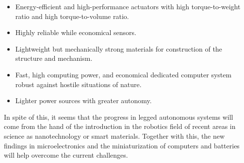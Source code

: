 \begin{itemize}
	\item Energy-efficient and high-performance actuators with high torque-to-weight ratio and high torque-to-volume ratio.
	\item Highly reliable while economical sensors.
	\item Lightweight but mechanically strong materials for construction of the structure and mechanism.
	\item Fast, high computing power, and economical dedicated computer system robust against hostile situations of nature.
	\item Lighter power sources with greater autonomy.
\label{list:hardware_challenges}
\end{itemize}

In spite of this, it seems that the progress in legged autonomous systems will come from the hand of the introduction in the robotics field of recent areas in science as nanotechnology or smart materials.
Together with this, the new findings in microelectronics and the miniaturization of computers and batteries will help overcome the current challenges.




